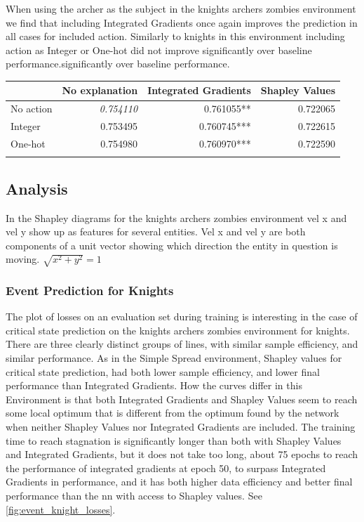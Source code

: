 \documentclass[UKenglish]{uiomasterthesis}
\begin{document}
When using the archer as the subject in the knights archers zombies environment we find that including Integrated Gradients once again improves the prediction in all cases for included action. Similarly to knights in this environment including action as Integer or One-hot did not improve significantly over baseline performance.significantly over baseline performance.

\begin{center}
\label{tab:event_kaz_arch}
\begin{tabular}{lrrr}
\toprule
 & No explanation & Integrated Gradients & Shapley Values \\
\midrule
No action & \textit{0.754110} & 0.761055** & 0.722065 \\
Integer & 0.753495 & 0.760745*** & 0.722615 \\
One-hot & 0.754980 & 0.760970*** & 0.722590 \\
\bottomrule
\addlinespace[2pt]
\multicolumn{3}{l}{\textsuperscript{***}$p<0.001$, 
  \textsuperscript{**}$p<0.01$, 
  \textsuperscript{*}$p<0.05$}
\end{tabular}
\end{center}



\subsection{Analysis}
In the Shapley diagrams for the knights archers zombies environment vel x and vel y show up as features for several entities. Vel x and vel y are both components of a unit vector showing which direction the entity in question is moving. $\sqrt{x^2 + y^2} = 1$

\subsubsection{Event Prediction for Knights}
The plot of losses on an evaluation set during training is interesting in the case of critical state prediction on the knights archers zombies environment for knights. There are three clearly distinct groups of lines, with similar sample efficiency, and similar performance. As in the Simple Spread environment, Shapley values for critical state prediction, had both lower sample efficiency, and lower final performance than Integrated Gradients. How the curves differ in this Environment is that both Integrated Gradients and Shapley Values seem to reach some local optimum that is different from the optimum found by the network when neither Shapley Values nor Integrated Gradients are included. The training time to reach stagnation is significantly longer than both with Shapley Values and Integrated Gradients, but it does not take too long, about 75 epochs to reach the performance of integrated gradients at epoch 50, to surpass Integrated Gradients in performance, and it has both higher data efficiency and better final performance than the \ac{nn} with access to Shapley values. See \cref{fig:event_knight_losses}.
\end{document}
